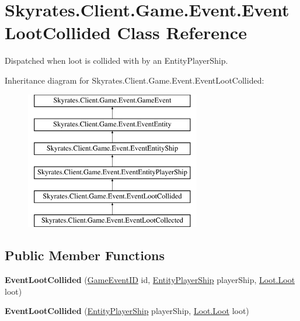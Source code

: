 \hypertarget{class_skyrates_1_1_client_1_1_game_1_1_event_1_1_event_loot_collided}{\section{Skyrates.\-Client.\-Game.\-Event.\-Event\-Loot\-Collided Class Reference}
\label{class_skyrates_1_1_client_1_1_game_1_1_event_1_1_event_loot_collided}
}


Dispatched when loot is collided with by an Entity\-Player\-Ship.  


Inheritance diagram for Skyrates.\-Client.\-Game.\-Event.\-Event\-Loot\-Collided\-:\begin{figure}[H]
\begin{center}
\leavevmode
\includegraphics[height=6.000000cm]{class_skyrates_1_1_client_1_1_game_1_1_event_1_1_event_loot_collided}
\end{center}
\end{figure}
\subsection*{Public Member Functions}
\begin{DoxyCompactItemize}
\item 
\hypertarget{class_skyrates_1_1_client_1_1_game_1_1_event_1_1_event_loot_collided_ae70f0ee848faf45446a663c046ec1a82}{{\bfseries Event\-Loot\-Collided} (\hyperlink{namespace_skyrates_1_1_client_1_1_game_1_1_event_a3a7e5dc62ad299d5e53abb4a3e5d5088}{Game\-Event\-I\-D} id, \hyperlink{class_skyrates_1_1_client_1_1_entity_1_1_entity_player_ship}{Entity\-Player\-Ship} player\-Ship, \hyperlink{class_skyrates_1_1_client_1_1_loot_1_1_loot}{Loot.\-Loot} loot)}\label{class_skyrates_1_1_client_1_1_game_1_1_event_1_1_event_loot_collided_ae70f0ee848faf45446a663c046ec1a82}

\item 
\hypertarget{class_skyrates_1_1_client_1_1_game_1_1_event_1_1_event_loot_collided_a85362a7ef6660125858f8d6a79a6288e}{{\bfseries Event\-Loot\-Collided} (\hyperlink{class_skyrates_1_1_client_1_1_entity_1_1_entity_player_ship}{Entity\-Player\-Ship} player\-Ship, \hyperlink{class_skyrates_1_1_client_1_1_loot_1_1_loot}{Loot.\-Loot} loot)}\label{class_skyrates_1_1_client_1_1_game_1_1_event_1_1_event_loot_collided_a85362a7ef6660125858f8d6a79a6288e}

\end{DoxyCompactItemize}
